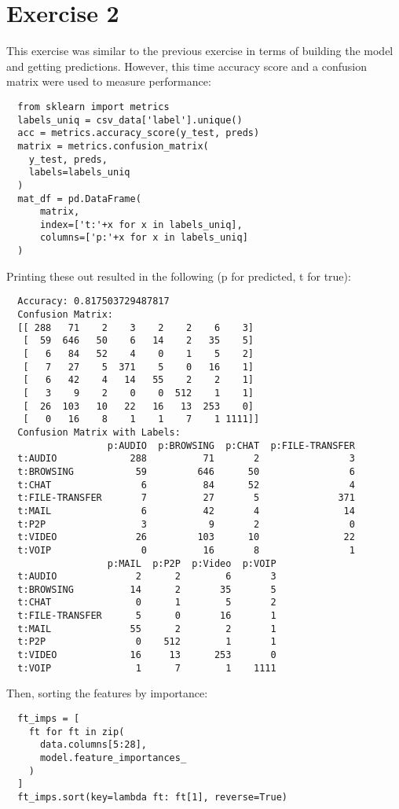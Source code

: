 \documentclass[11pt]{article}
\begin{document}
\section*{Exercise 2}
This exercise was similar to the previous exercise in terms of building the model and getting predictions. However, this time accuracy score and a confusion
matrix were used to measure performance:
\begin{verbatim}
  from sklearn import metrics
  labels_uniq = csv_data['label'].unique()
  acc = metrics.accuracy_score(y_test, preds)
  matrix = metrics.confusion_matrix(
    y_test, preds,
    labels=labels_uniq
  )
  mat_df = pd.DataFrame(
      matrix,
      index=['t:'+x for x in labels_uniq],
      columns=['p:'+x for x in labels_uniq]
  )
\end{verbatim}
Printing these out resulted in the following (p for predicted, t for true):
\begin{verbatim}
  Accuracy: 0.817503729487817
  Confusion Matrix:
  [[ 288   71    2    3    2    2    6    3]
   [  59  646   50    6   14    2   35    5]
   [   6   84   52    4    0    1    5    2]
   [   7   27    5  371    5    0   16    1]
   [   6   42    4   14   55    2    2    1]
   [   3    9    2    0    0  512    1    1]
   [  26  103   10   22   16   13  253    0]
   [   0   16    8    1    1    7    1 1111]]
  Confusion Matrix with Labels:
                  p:AUDIO  p:BROWSING  p:CHAT  p:FILE-TRANSFER  
  t:AUDIO             288          71       2                3
  t:BROWSING           59         646      50                6
  t:CHAT                6          84      52                4
  t:FILE-TRANSFER       7          27       5              371
  t:MAIL                6          42       4               14
  t:P2P                 3           9       2                0
  t:VIDEO              26         103      10               22
  t:VOIP                0          16       8                1
                  p:MAIL  p:P2P  p:Video  p:VOIP
  t:AUDIO              2      2        6       3
  t:BROWSING          14      2       35       5
  t:CHAT               0      1        5       2
  t:FILE-TRANSFER      5      0       16       1
  t:MAIL              55      2        2       1
  t:P2P                0    512        1       1
  t:VIDEO             16     13      253       0
  t:VOIP               1      7        1    1111
\end{verbatim}
Then, sorting the features by importance:
\begin{verbatim}
  ft_imps = [
    ft for ft in zip(
      data.columns[5:28],
      model.feature_importances_
    )
  ]
  ft_imps.sort(key=lambda ft: ft[1], reverse=True)
\end{verbatim}
\end{document}
